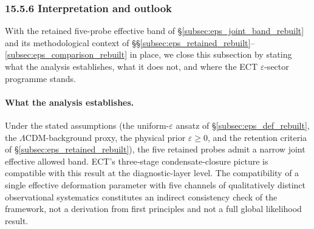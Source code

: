 %
%
%
%

\subsubsection*{\normalfont\textbf{15.5.6 \quad Interpretation and outlook}}
\label{subsec:eps_outlook_rebuilt}

With the retained five-probe effective band of
\S\ref{subsec:eps_joint_band_rebuilt} and its methodological context of
\S\S\ref{subsec:eps_retained_rebuilt}--\ref{subsec:eps_comparison_rebuilt}
in place, we close this subsection by stating what the analysis
establishes, what it does not, and where the ECT $\varepsilon$-sector
programme stands.

\paragraph{What the analysis establishes.}
Under the stated assumptions (the uniform-$\varepsilon$ ansatz of
\S\ref{subsec:eps_def_rebuilt}, the $\Lambda$CDM-background proxy, the
physical prior $\varepsilon \geq 0$, and the retention criteria of
\S\ref{subsec:eps_retained_rebuilt}), the five retained probes admit a
narrow joint effective allowed band. ECT's three-stage
condensate-closure picture is compatible with this result at the
diagnostic-layer level. The compatibility of a single effective
deformation parameter with five channels of qualitatively distinct
observational systematics constitutes an indirect consistency check
of the framework, not a derivation from first principles and not a
full global likelihood result.

